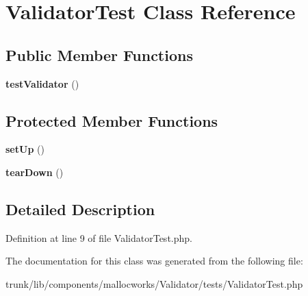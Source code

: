 \hypertarget{class_validator_test}{
\section{ValidatorTest Class Reference}
\label{class_validator_test}
}
\subsection*{Public Member Functions}
\begin{DoxyCompactItemize}
\item 
\hypertarget{class_validator_test_a80b1a60ee4c7a8d6ddd70308e673a095}{
{\bfseries testValidator} ()}
\label{class_validator_test_a80b1a60ee4c7a8d6ddd70308e673a095}

\end{DoxyCompactItemize}
\subsection*{Protected Member Functions}
\begin{DoxyCompactItemize}
\item 
\hypertarget{class_validator_test_a0bc688732d2b3b162ffebaf7812e78da}{
{\bfseries setUp} ()}
\label{class_validator_test_a0bc688732d2b3b162ffebaf7812e78da}

\item 
\hypertarget{class_validator_test_a80fe3d17e658907fc75346a0ec9d6fc7}{
{\bfseries tearDown} ()}
\label{class_validator_test_a80fe3d17e658907fc75346a0ec9d6fc7}

\end{DoxyCompactItemize}


\subsection{Detailed Description}


Definition at line 9 of file ValidatorTest.php.



The documentation for this class was generated from the following file:\begin{DoxyCompactItemize}
\item 
trunk/lib/components/mallocworks/Validator/tests/ValidatorTest.php\end{DoxyCompactItemize}
